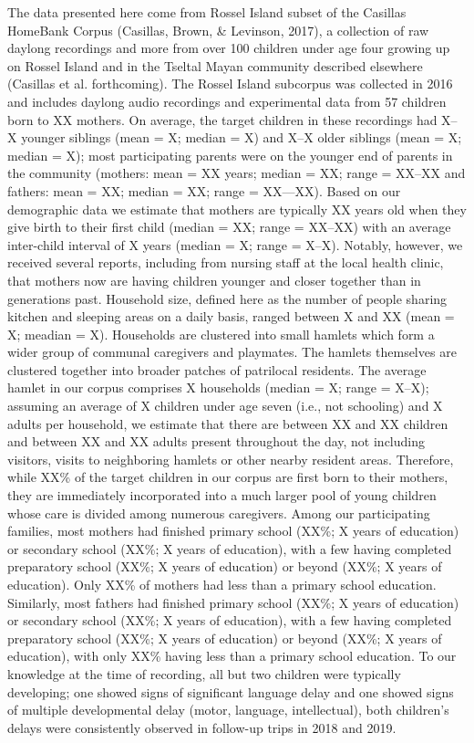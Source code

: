 \documentclass[,man,floatsintext]{apa6}
\begin{document}
The data presented here come from Rossel Island subset of the Casillas
HomeBank Corpus (Casillas, Brown, \& Levinson, 2017), a collection of
raw daylong recordings and more from over 100 children under age four
growing up on Rossel Island and in the Tseltal Mayan community described
elsewhere (Casillas et al. forthcoming). The Rossel Island subcorpus was
collected in 2016 and includes daylong audio recordings and experimental
data from 57 children born to XX mothers. On average, the target
children in these recordings had X--X younger siblings (mean = X; median
= X) and X--X older siblings (mean = X; median = X); most participating
parents were on the younger end of parents in the community (mothers:
mean = XX years; median = XX; range = XX--XX and fathers: mean = XX;
median = XX; range = XX---XX). Based on our demographic data we estimate
that mothers are typically XX years old when they give birth to their
first child (median = XX; range = XX--XX) with an average inter-child
interval of X years (median = X; range = X--X). Notably, however, we
received several reports, including from nursing staff at the local
health clinic, that mothers now are having children younger and closer
together than in generations past. Household size, defined here as the
number of people sharing kitchen and sleeping areas on a daily basis,
ranged between X and XX (mean = X; meadian = X). Households are
clustered into small hamlets which form a wider group of communal
caregivers and playmates. The hamlets themselves are clustered together
into broader patches of patrilocal residents. The average hamlet in our
corpus comprises X households (median = X; range = X--X); assuming an
average of X children under age seven (i.e., not schooling) and X adults
per household, we estimate that there are between XX and XX children and
between XX and XX adults present throughout the day, not including
visitors, visits to neighboring hamlets or other nearby resident areas.
Therefore, while XX\% of the target children in our corpus are first
born to their mothers, they are immediately incorporated into a much
larger pool of young children whose care is divided among numerous
caregivers. Among our participating families, most mothers had finished
primary school (XX\%; X years of education) or secondary school (XX\%; X
years of education), with a few having completed preparatory school
(XX\%; X years of education) or beyond (XX\%; X years of education).
Only XX\% of mothers had less than a primary school education.
Similarly, most fathers had finished primary school (XX\%; X years of
education) or secondary school (XX\%; X years of education), with a few
having completed preparatory school (XX\%; X years of education) or
beyond (XX\%; X years of education), with only XX\% having less than a
primary school education. To our knowledge at the time of recording, all
but two children were typically developing; one showed signs of
significant language delay and one showed signs of multiple
developmental delay (motor, language, intellectual), both children's
delays were consistently observed in follow-up trips in 2018 and 2019.
\end{document}
